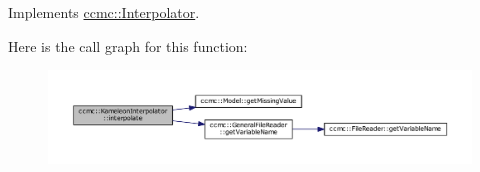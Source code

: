 Implements \hyperlink{classccmc_1_1_interpolator_aa6b272bd53630020d92938ec1e5cfad9}{ccmc\-::\-Interpolator}.



Here is the call graph for this function\-:
\nopagebreak
\begin{figure}[H]
\begin{center}
\leavevmode
\includegraphics[width=350pt]{classccmc_1_1_kameleon_interpolator_a510590ccb55b491c9105a9c5db91cd42_cgraph}
\end{center}
\end{figure}




